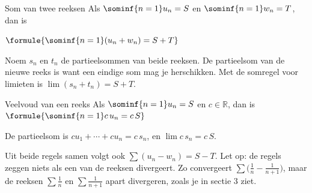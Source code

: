\begin{theorie}
\begin{stelling}{Som van twee reeksen}
Als $\sominf{n=1} u_n = S$ en $\sominf{n=1} w_n = T$, dan is

\vspace{1mm}
\qquad $\formule{\sominf{n=1} (u_n + w_n) = S + T}$
\end{stelling}

\begin{bewijs}
Noem $s_n$ en $t_n$ de partieelsommen van beide reeksen. De partieelsom van de nieuwe reeks is
want een eindige som mag je herschikken. Met de somregel voor limieten is $\lim (s_n + t_n) = S + T$.
\end{bewijs}
\end{theorie}

\begin{theorie}
\begin{stelling}{Veelvoud van een reeks}
Als $\sominf{n=1} u_n = S$ en $c \in \mathbb{R}$, dan is \quad $\formule{\sominf{n=1} c\,u_n = c\,S}$
\end{stelling}

\begin{bewijs}
De partieelsom is $c u_1 + \cdots + c u_n = c\,s_n$, en $\lim c\,s_n = c\,S$.
\end{bewijs}
\end{theorie}

Uit beide regels samen volgt ook $\sum (u_n - w_n) = S - T$. Let op: de regels zeggen niets als een van de reeksen divergeert. Zo convergeert $\sum \bigl(\tfrac1n - \tfrac{1}{n+1}\bigr)$, maar de reeksen $\sum \tfrac1n$ en $\sum \tfrac{1}{n+1}$ apart divergeren, zoals je in sectie 3 ziet.


